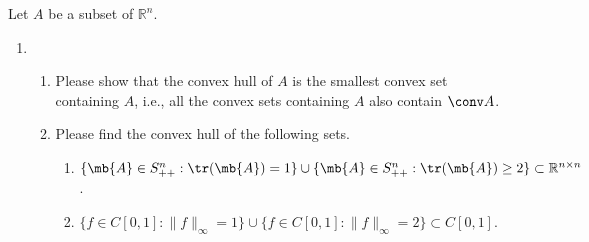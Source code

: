 \begin{exercise}
  Let $A$ be a subset of $\mathbb{R}^n$.
  \begin{enumerate}
    \item \begin{enumerate}
        \item Please show that the convex hull of $A$ is the smallest convex set containing $A$, i.e., all the convex sets containing $A$ also contain $\conv A$.
        \item Please find the convex hull of the following sets.
          \begin{enumerate}
            \item $\{\mb{A}\in S_{++}^n: \tr(\mb{A})=1\}\cup \{\mb{A}\in S_{++}^n: \tr(\mb{A})\ge2\}\subset\mathbb{R}^{n\times n}$.
            \item $\{f\in C[0,1]:\|f\|_\infty=1 \}\cup \{f\in C[0,1]:\|f\|_\infty=2 \}\subset C[0,1]$.
          \end{enumerate}
      \end{enumerate}


\end{enumerate}
\end{exercise}

